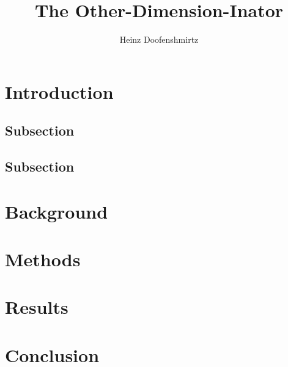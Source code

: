 \documentclass{ndreureport}
\author{Heinz Doofenshmirtz}
\title{The Other-Dimension-Inator}
\begin{document}
\maketitle


\begin{abstract}
    \lipsum[1]
\end{abstract}


\section{Introduction}

\lipsum[3]

\subsection{Subsection}

\lipsum[4]

\subsection{Subsection}

\lipsum[3]

\section{Background}

\lipsum[5]

\section{Methods}

\lipsum[2]

\section{Results}

\lipsum[6]

\section{Conclusion}

\lipsum[2]


\end{document}
